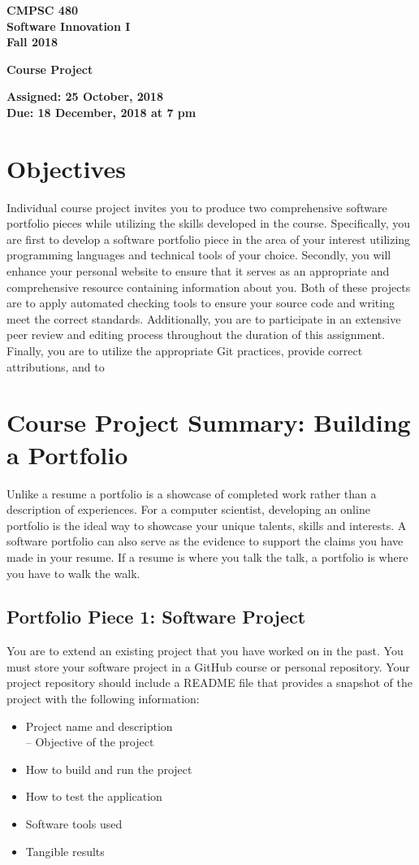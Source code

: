 \documentclass[11pt]{article}
\newcommand{\assignmentduedate}{18 December}
\newcommand{\assignmentassignedate}{ 25 October}
\newcommand{\assignmentnumber}{Course Project}
\newcommand{\labyear}{2018}
\newcommand{\labtime}{7 pm}
\newcommand{\assigneddate}{Assigned:  \assignmentassignedate, \labyear{} }
\newcommand{\duedate}{Due:  \assignmentduedate, \labyear{} at \labtime{}}
\newcommand{\labtitle}[1]
{
  \begin{center}
    \begin{center}
      \bf
      CMPSC 480 \\ Software Innovation I\\
      Fall 2018\\
      \medskip
    \end{center}
    \bf
    #1
  \end{center}
}
\begin{document}
\thispagestyle{empty}

\labtitle{ \assignmentnumber{} }
\begin{center} \textbf{ \assigneddate{} \\ \duedate{} } \end{center} 
\noindent \textbf{ }

\section*{Objectives}
Individual course project invites you to produce two comprehensive software portfolio pieces while utilizing the skills developed in the course. Specifically, you are first to develop a software portfolio piece in the area of your interest utilizing programming languages and technical tools of your choice.  Secondly, you will enhance your personal website  to ensure that it serves as an appropriate and comprehensive resource containing information about you. Both of these projects are to apply automated checking tools to ensure your source code and writing meet the correct standards. Additionally, you are to participate in an extensive peer review and editing process throughout the duration of this assignment. Finally, you are to utilize the appropriate Git practices, provide correct attributions, and to 

\section*{Course Project Summary: Building a Portfolio}
Unlike a resume a portfolio is a showcase of completed work rather than a description of experiences. For a computer scientist, developing an online portfolio is the ideal way to showcase your unique talents, skills and interests. A software portfolio can also serve as the evidence to support the claims you have made in your resume. If a resume is where you talk the talk, a portfolio is where you have to walk the walk.

\subsection*{Portfolio Piece 1: Software Project}

You are to extend an existing project that you have worked on in the past. You must store your software project in a GitHub course or personal repository. Your project repository should include a README file that provides a snapshot of the project with the following information:
\begin{itemize}
	\item Project name and description \\
	-- Objective of the project
	\item How to build and run the project
	\item How to test the application
	\item Software tools used
	\item Tangible results
\end{itemize}
\end{document}
